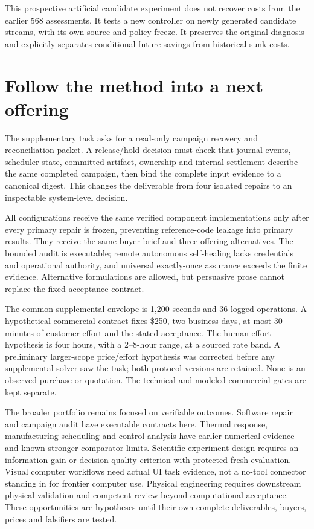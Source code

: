 \documentclass[11pt,letterpaper]{article}
\begin{document}


This prospective artificial candidate experiment does not recover costs from the earlier 568 assessments. It tests a new controller on newly generated candidate streams, with its own source and policy freeze. It preserves the original diagnosis and explicitly separates conditional future savings from historical sunk costs.

\section{Follow the method into a next offering}
The supplementary task asks for a read-only campaign recovery and reconciliation packet. A release/hold decision must check that journal events, scheduler state, committed artifact, ownership and internal settlement describe the same completed campaign, then bind the complete input evidence to a canonical digest. This changes the deliverable from four isolated repairs to an inspectable system-level decision.

All configurations receive the same verified component implementations only after every primary repair is frozen, preventing reference-code leakage into primary results. They receive the same buyer brief and three offering alternatives. The bounded audit is executable; remote autonomous self-healing lacks credentials and operational authority, and universal exactly-once assurance exceeds the finite evidence. Alternative formulations are allowed, but persuasive prose cannot replace the fixed acceptance contract.

The common supplemental envelope is 1,200 seconds and 36 logged operations. A hypothetical commercial contract fixes \$250, two business days, at most 30 minutes of customer effort and the stated acceptance. The human-effort hypothesis is four hours, with a 2--8-hour range, at a sourced rate band. A preliminary larger-scope price/effort hypothesis was corrected before any supplemental solver saw the task; both protocol versions are retained. None is an observed purchase or quotation. The technical and modeled commercial gates are kept separate.



The broader portfolio remains focused on verifiable outcomes. Software repair and campaign audit have executable contracts here. Thermal response, manufacturing scheduling and control analysis have earlier numerical evidence and known stronger-comparator limits. Scientific experiment design requires an information-gain or decision-quality criterion with protected fresh evaluation. Visual computer workflows need actual UI task evidence, not a no-tool connector standing in for frontier computer use. Physical engineering requires downstream physical validation and competent review beyond computational acceptance. These opportunities are hypotheses until their own complete deliverables, buyers, prices and falsifiers are tested.
\end{document}
